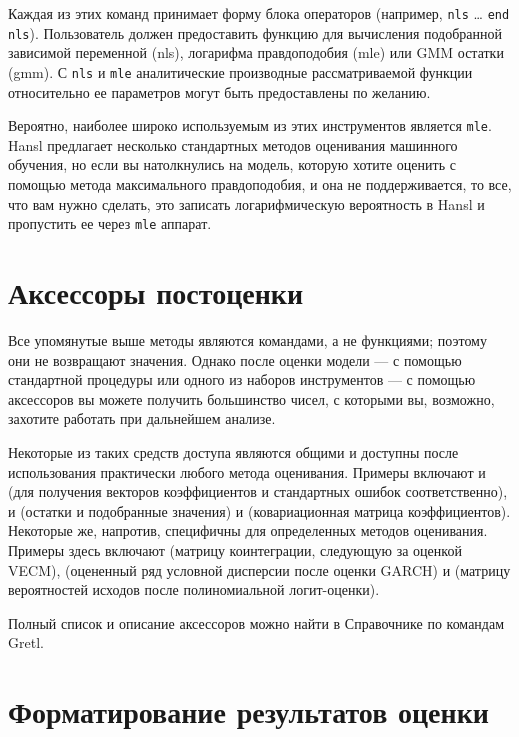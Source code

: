 Каждая из этих команд принимает форму блока операторов (например,
\texttt{nls} \dots{} \texttt{end nls}). Пользователь должен
предоставить функцию для вычисления подобранной зависимой переменной
(nls), логарифма правдоподобия (mle) или GMM остатки (gmm). С
\texttt{nls} и \texttt{mle} аналитические производные рассматриваемой
функции относительно ее параметров могут быть предоставлены по
желанию.

Вероятно, наиболее широко используемым из этих инструментов является
\texttt{mle}. Hansl предлагает несколько стандартных методов
оценивания машинного обучения, но если вы натолкнулись на модель,
которую хотите оценить с помощью метода максимального правдоподобия, и
она не поддерживается, то все, что вам нужно сделать, это записать
логарифмическую вероятность в Hansl и пропустить ее через \texttt{mle}
аппарат.

\section{Аксессоры постоценки}
\label{sec:postest-accessors}

Все упомянутые выше методы являются командами, а не функциями; поэтому
они не возвращают значения. Однако после оценки модели --- с помощью
стандартной процедуры или одного из наборов инструментов --- с помощью
аксессоров вы можете получить большинство чисел, с которыми вы,
возможно, захотите работать при дальнейшем анализе.

Некоторые из таких средств доступа являются общими и доступны после
использования практически любого метода оценивания. Примеры включают
 и  (для получения векторов коэффициентов
и стандартных ошибок соответственно),  и 
(остатки и подобранные значения) и  (ковариационная
матрица коэффициентов). Некоторые же, напротив, специфичны для
определенных методов оценивания. Примеры здесь включают 
(матрицу коинтеграции, следующую за оценкой VECM), 
(оцененный ряд условной дисперсии после оценки GARCH) и
 (матрицу вероятностей исходов после полиномиальной
логит-оценки).

Полный список и описание аксессоров можно найти в Справочнике по
командам Gretl.

\section{Форматирование результатов оценки}
\label{sec:model-format}

